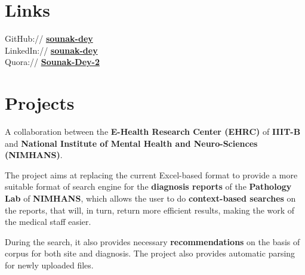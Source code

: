 \documentclass[]{essdee-resume}
\begin{document}
\begin{minipage}[t]{0.33\textwidth}

\section{Links} 
GitHub:// \href{https://github.com/Sounak-Dey}{\bf sounak-dey} \\
LinkedIn://  \href{https://www.linkedin.com/in/sounak-dey}{\bf sounak-dey} \\
Quora://  \href{https://www.quora.com/profile/Sounak-Dey-2}{\bf Sounak-Dey-2}


%
%

\end{minipage} 
\hfill
\begin{minipage}[t]{0.66\textwidth} 


\section{Projects}

\vspace{\topsep} %
\begin{tightemize}
\item A collaboration between the \textbf{E-Health Research Center (EHRC)} of \textbf{IIIT-B} and  \textbf{National Institute of Mental Health and Neuro-Sciences (NIMHANS)}. 
\item The project aims at replacing the current Excel-based format to provide a more suitable format of search engine for the \textbf{diagnosis reports} of the \textbf{Pathology Lab} of \textbf{NIMHANS}, which allows the user to do \textbf{context-based searches} on the reports, that will, in turn, return more efficient results, making the work of the medical staff easier.
\item During the search, it also provides necessary \textbf{recommendations} on the basis of corpus for both site and diagnosis. The project also provides automatic parsing for newly uploaded files. 
\end{tightemize}
\sectionsep


\end{minipage}
\end{document}
